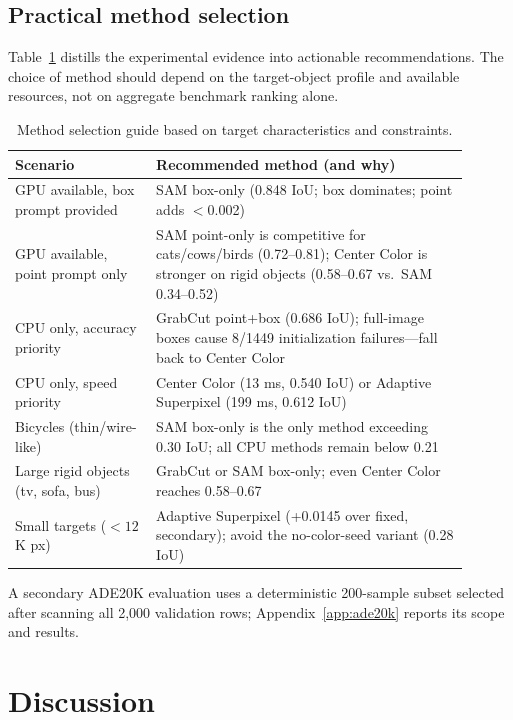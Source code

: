 \subsection{Practical method selection}

Table~\ref{tab:guidance} distills the experimental evidence into actionable recommendations. The choice of method should depend on the target-object profile and available resources, not on aggregate benchmark ranking alone.

\begin{table}[ht]
\centering
\caption{Method selection guide based on target characteristics and constraints.}
\label{tab:guidance}
\begin{tabular}{p{0.28\linewidth}p{0.62\linewidth}}
\toprule
Scenario & Recommended method (and why) \\
\midrule
GPU available, box prompt provided & SAM box-only (0.848 IoU; box dominates; point adds $<$0.002) \\
GPU available, point prompt only & SAM point-only is competitive for cats/cows/birds (0.72--0.81); Center Color is stronger on rigid objects (0.58--0.67 vs.\ SAM 0.34--0.52) \\
CPU only, accuracy priority & GrabCut point+box (0.686 IoU); full-image boxes cause 8/1449 initialization failures---fall back to Center Color \\
CPU only, speed priority & Center Color (13 ms, 0.540 IoU) or Adaptive Superpixel (199 ms, 0.612 IoU) \\
Bicycles (thin/wire-like) & SAM box-only is the only method exceeding 0.30 IoU; all CPU methods remain below 0.21 \\
Large rigid objects (tv, sofa, bus) & GrabCut or SAM box-only; even Center Color reaches 0.58--0.67 \\
Small targets ($<12$K px) & Adaptive Superpixel (+0.0145 over fixed, secondary); avoid the no-color-seed variant (0.28 IoU) \\
\bottomrule
\end{tabular}
\end{table}

\noindent A secondary ADE20K evaluation uses a deterministic 200-sample subset selected after scanning all 2,000 validation rows; Appendix~\ref{app:ade20k} reports its scope and results.

\section{Discussion}


